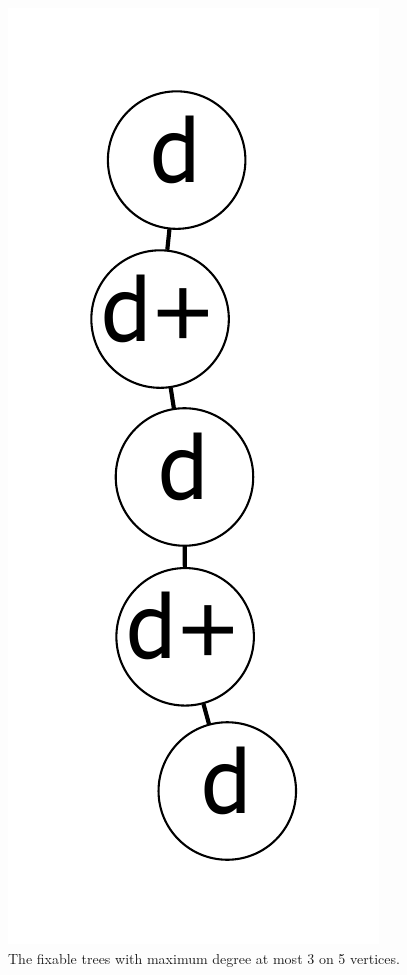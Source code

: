 \documentclass[12pt]{article}
\theoremstyle{plain}
\theoremstyle{definition}
\theoremstyle{remark}
\begin{document}
\begin{figure}[!htb]
\includegraphics[scale=0.25]{Superabundance/MaxDegree3Trees/0101011000[3,3,1,1,2].pdf}
\caption{The fixable trees with maximum degree at most 3 on 5 vertices.}
\label{fig:fixable5tree}
\end{figure}
		
\end{document}

